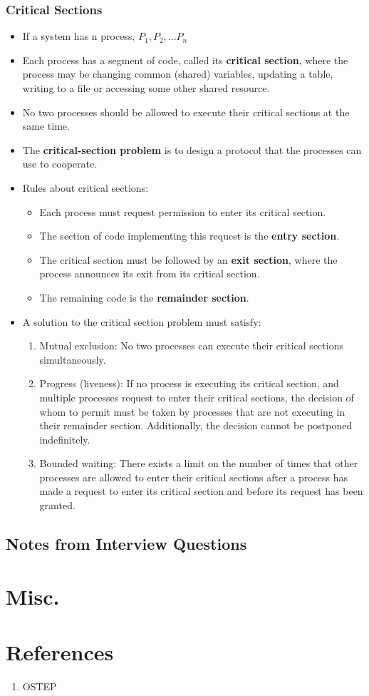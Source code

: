 \documentclass[10pt]{report}
\begin{document}
\subsection{Critical Sections}
\begin{itemize}
\item If a system has n process, $P_1, P_2, ... P_n$
\item Each process has a segment of code, called its \textbf{critical section}, where the process may be changing common (shared) variables, updating a table, writing to a file or accessing some other shared resource.
\item No two processes should be allowed to execute their critical sections at the same time.
\item The \textbf{critical-section problem} is to design a protocol that the processes can use to cooperate.
\item Rules about critical sections:
\begin{itemize}
\item Each process must request permission to enter its critical section.
\item The section of code implementing this request is the \textbf{entry section}.
\item The critical section must be followed by an \textbf{exit section}, where the process announces its exit from its critical section.
\item The remaining code is the \textbf{remainder section}.
\end{itemize}
\item A solution to the critical section problem must satisfy:
\begin{enumerate}
\item Mutual exclusion: No two processes can execute their critical sections simultaneously.
\item Progress (liveness): If no process is executing its critical section, and multiple processes request to enter their critical sections, the decision of whom to permit must be taken by processes that are not executing in their remainder section. Additionally, the decision cannot be postponed indefinitely.
\item Bounded waiting: There exists a limit on the number of times that other processes are allowed to enter their critical sections after a process has made a request to enter its critical section and before its request has been granted.
\end{enumerate}
\end{itemize}
\section{Notes from Interview Questions}
\chapter{Misc.}
\chapter{References}
\begin{enumerate}
\item OSTEP
\end{enumerate}
\end{document}

